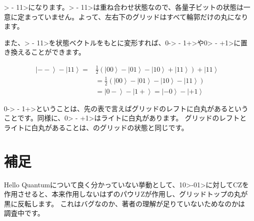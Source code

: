 \textbar{}{-}{-}\textgreater{} {-} \textbar{}11\textgreater{}になります。\textbar{}{-}{-}\textgreater{} {-} \textbar{}11\textgreater{}は重ね合わせ状態なので、各量子ビットの状態は一意に定まっていません。よって、左右下のグリッドはすべて輪郭だけの丸になります。

また、\textbar{}{-}{-}\textgreater{} {-} \textbar{}11\textgreater{}を状態ベクトルをもとに変形すれば、\textbar{}0{-}\textgreater{} {-} \textbar{}1+\textgreater{}や\textbar{}{-}0\textgreater{} {-} \textbar{}+1\textgreater{}に置き換えることができます。

\begin{equation*}
    \begin{split}
		\left| -- \right> - \left| 11 \right> =& \frac{1}{2} \left( \left| 00 \right> - \left| 01 \right> - \left| 10 \right> + \left| 11 \right> \right) + \left| 11 \right> \\
		&= \frac{1}{2} \left( \left| 00 \right> - \left| 01 \right> - \left| 10 \right> - \left| 11 \right> \right) \\
		&= \left| 0- \right> - \left| 1+ \right> = \left| -0 \right> - \left| +1 \right>
    \end{split}
\end{equation*}

\textbar{}0{-}\textgreater{} {-} \textbar{}1+\textgreater{}ということは、先の表で言えばグリッドのレフトに白丸があるということです。同様に、\textbar{}{-}0\textgreater{} {-} \textbar{}+1\textgreater{}はライトに白丸があります。
グリッドのレフトとライトに白丸があることは、のグリッドの状態と同じです。

\section*{補足}
\label{sec:1-6}

Hello Quantumについて良く分かっていない挙動として、\textbar{}10\textgreater{}{-}\textbar{}01\textgreater{}に対してCZを作用させると、本来作用しないはずのパウリZが作用し、グリッドトップの丸が黒に反転します。
これはバグなのか、著者の理解が足りていないためなのかは調査中です。
